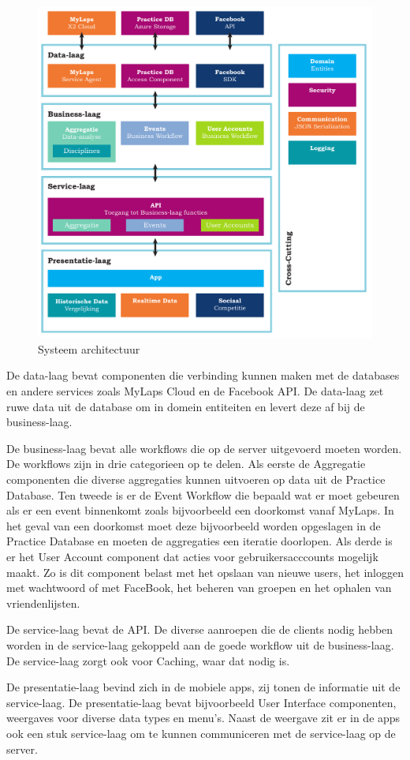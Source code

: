 \begin{figure}
\centering
\includegraphics[width=\textwidth]{style/images/Systeem+Architectuur}
\caption{Systeem architectuur}
\label{fig:architecture}
\end{figure}

De data-laag bevat componenten die verbinding kunnen maken met de databases en 
andere services zoals MyLaps Cloud en de Facebook API. De data-laag zet ruwe data 
uit de database om in domein entiteiten en levert deze af bij de business-laag.

De business-laag bevat alle workflows die op de server uitgevoerd moeten worden. 
De workflows zijn in drie categorieen op te delen. Als eerste de Aggregatie
componenten die diverse aggregaties kunnen uitvoeren op data uit de Practice
Database. Ten tweede is er de Event Workflow die bepaald wat er moet gebeuren als
er een event binnenkomt zoals bijvoorbeeld een doorkomst vanaf MyLaps. In het
geval van een doorkomst moet deze bijvoorbeeld worden opgeslagen in de Practice
Database en moeten de aggregaties een iteratie doorlopen. Als derde is er het User
Account component dat acties voor gebruikersacccounts mogelijk maakt. Zo is dit
component belast met het opslaan van nieuwe users, het inloggen met wachtwoord of
met FaceBook, het beheren van groepen en het ophalen van vriendenlijsten.

De service-laag bevat de API. De diverse aanroepen die de clients nodig hebben
worden in de service-laag gekoppeld aan de goede workflow uit de business-laag. De
service-laag zorgt ook voor Caching, waar dat nodig is.

De presentatie-laag bevind zich in de mobiele apps, zij tonen de informatie uit de
service-laag. De presentatie-laag bevat bijvoorbeeld User Interface componenten, 
weergaves voor diverse data types en menu's. Naast de weergave zit er in de apps 
ook een stuk service-laag om te kunnen communiceren met de service-laag op de 
server.